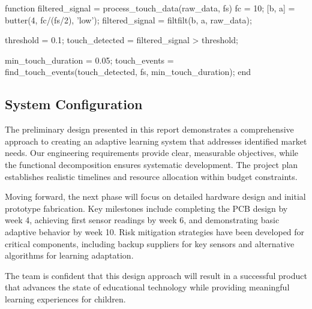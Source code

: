 \documentclass[final]{designreport}
\begin{document}
\begin{reportmatlab}[caption={Touch Sensor Signal Processing}]
function filtered_signal = process_touch_data(raw_data, fs)
    fc = 10; %
    [b, a] = butter(4, fc/(fs/2), 'low');
    filtered_signal = filtfilt(b, a, raw_data);
    
    threshold = 0.1;
    touch_detected = filtered_signal > threshold;
    
    min_touch_duration = 0.05; %
    touch_events = find_touch_events(touch_detected, fs, min_touch_duration);
end
\end{reportmatlab}

\subsection{System Configuration}


\conclusionoutlook
The preliminary design presented in this report demonstrates a comprehensive approach to creating an adaptive learning system that addresses identified market needs. Our engineering requirements provide clear, measurable objectives, while the functional decomposition ensures systematic development. The project plan establishes realistic timelines and resource allocation within budget constraints.

Moving forward, the next phase will focus on detailed hardware design and initial prototype fabrication. Key milestones include completing the PCB design by week 4, achieving first sensor readings by week 6, and demonstrating basic adaptive behavior by week 10. Risk mitigation strategies have been developed for critical components, including backup suppliers for key sensors and alternative algorithms for learning adaptation.

The team is confident that this design approach will result in a successful product that advances the state of educational technology while providing meaningful learning experiences for children.
\end{document}
